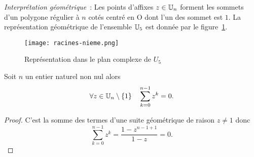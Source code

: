 \emph{Interprétation géométrique}~: Les points d'affixes $z \in \mathbb{U}_n$ forment les sommets d'un polygone régulier à $n$ cotés centré en O dont l'un des sommet est $1$. La représentation géométrique de l'ensemble $\mathbb{U}_5$ est donnée par le figure~\ref{fig:racinesnieme}.
\begin{figure}
  \centering
  \texttt{[image: racines-nieme.png]}
  \caption{Représentation dans le plan complexe de $U_5$}
  \label{fig:racinesnieme}
\end{figure}

\begin{theo}
  Soit $n$ un entier naturel non nul alors
  \begin{equation}
    \forall z \in \mathbb{U}_n \setminus \{1\} \quad \sum_{k=0}^{n-1} z^k = 0.
  \end{equation}
\end{theo}
\begin{proof}
  C'est la somme des termes d'une suite géométrique de raison $z \neq 1$ donc
  \begin{equation}
    \sum_{k=0}^{n-1} z^k = \frac{1-z^{n-1+1}}{1-z} = 0.
  \end{equation}
\end{proof}

